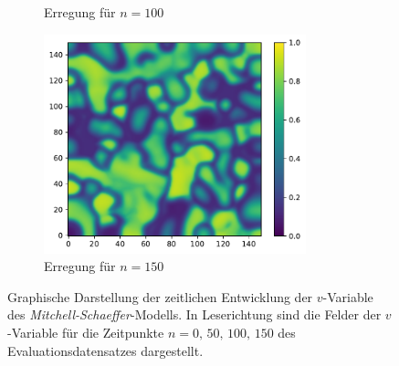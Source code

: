 \begin{appendices}
\begin{figure}[h]
\begin{subfigure}{.5\textwidth}
		\setcapmargin[1cm]{0.5cm}
		\caption{Erregung für $n=100$}
	\end{subfigure}%
	\begin{subfigure}{.5\textwidth}
		\centering
		\includegraphics[height=2.5in]{figures/results/dynamics/mitchell_150.pdf}
		\setcapmargin[1cm]{0.5cm}
		\caption{Erregung für $n=150$}
	\end{subfigure}
	\caption{Graphische Darstellung der zeitlichen Entwicklung der $v$-Variable des \textit{Mitchell-Schaeffer}-Modells. In Leserichtung sind die Felder der $v$-Variable für die Zeitpunkte $n=0,\, 50,\, 100,\, 150$ des Evaluationsdatensatzes dargestellt.}
	\label{fig:apx_mitchell_evolution}
\end{figure} 


\end{appendices}
